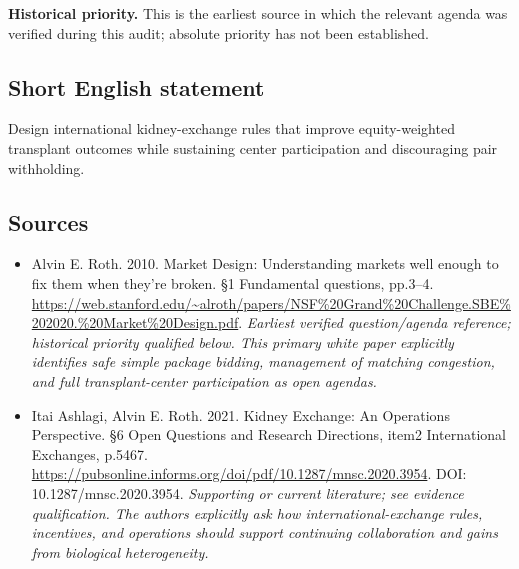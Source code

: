 \documentclass[11pt]{article}
\begin{document}
\par\textbf{Historical priority.} This is the earliest source in which the relevant agenda was verified during this audit; absolute priority has not been established.

\subsection{Short English statement}
Design international kidney-exchange rules that improve equity-weighted transplant outcomes while sustaining center participation and discouraging pair withholding.

\subsection{Sources}
\begin{itemize}\raggedright
\item[\textnormal{[S1]}]\hypertarget{source:30007580:1}{} Alvin E. Roth. 2010. Market Design: Understanding markets well enough to fix them when they’re broken. §1 Fundamental questions, pp.3–4.
\url{https://web.stanford.edu/~alroth/papers/NSF%20Grand%20Challenge.SBE%202020.%20Market%20Design.pdf}.
{\small\textit{Earliest verified question/agenda reference; historical priority qualified below. This primary white paper explicitly identifies safe simple package bidding, management of matching congestion, and full transplant-center participation as open agendas.}}

\item[\textnormal{[S2]}]\hypertarget{source:30007580:2}{} Itai Ashlagi, Alvin E. Roth. 2021. Kidney Exchange: An Operations Perspective. §6 Open Questions and Research Directions, item2 International Exchanges, p.5467.
\url{https://pubsonline.informs.org/doi/pdf/10.1287/mnsc.2020.3954}.
DOI: 10.1287/mnsc.2020.3954.
{\small\textit{Supporting or current literature; see evidence qualification. The authors explicitly ask how international-exchange rules, incentives, and operations should support continuing collaboration and gains from biological heterogeneity.}}
\end{itemize}
\end{document}
